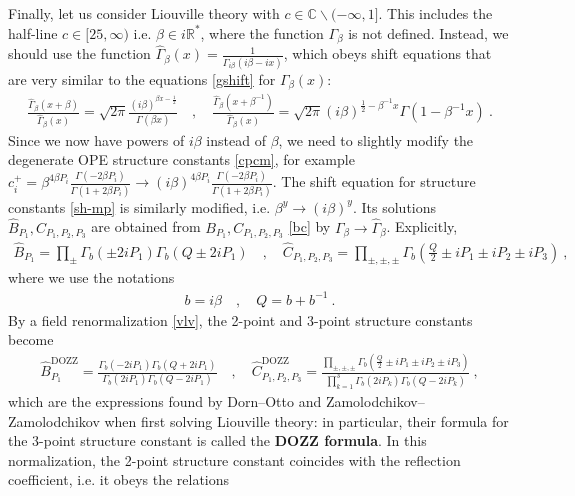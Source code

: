 \documentclass[12pt, a4paper]{article}
\newcommand{\myindex}[1]{\textbf{\boldmath #1}}
\begin{document}
Finally, let us consider Liouville theory with $c\in \mathbb{C}\backslash (-\infty,1]$. This includes the half-line $c\in [25,\infty)$ i.e. $\beta\in i\mathbb{R}^*$, where the function $\Gamma_\beta$ is not defined.
Instead, we should use the function $\hat{\Gamma}_\beta(x) = \frac{1}{\Gamma_{i\beta}(i\beta -ix)}$, which obeys shift equations that are very similar to the equations \eqref{gshift} for $\Gamma_\beta(x)$: 
\begin{align}
 \frac{\hat\Gamma_\beta(x+\beta)}{\hat\Gamma_\beta(x)} = \sqrt{2\pi}\frac{(i\beta)^{\beta x-\frac12}}{\Gamma(\beta x)}
\quad , \quad 
\frac{\hat\Gamma_\beta(x+\beta^{-1})}{\hat\Gamma_\beta(x)} = \sqrt{2\pi}(i\beta)^{\frac12-\beta^{-1}x}\Gamma(1-\beta^{-1}x) \ .
\label{hgshift}
\end{align}
Since we now have powers of $i\beta$ instead of $\beta$, we need to slightly modify the degenerate OPE structure constants \eqref{cpcm}, for example $c_i^+ = \beta^{4\beta P_i}\frac{\Gamma(-2\beta P_i)}{\Gamma(1+2\beta P_i)} \to (i\beta)^{4\beta P_i}\frac{\Gamma(-2\beta P_i)}{\Gamma(1+2\beta P_i)}$. The shift equation for structure constants \eqref{sh-mp} is similarly modified, i.e. $\beta^y \to (i\beta)^y$. Its solutions $\hat B_{P_1},\hat C_{P_1,P_2,P_3}$ are obtained from $B_{P_1},C_{P_1,P_2,P_3}$ \eqref{bc} by $\Gamma_\beta \to \hat\Gamma_\beta$. Explicitly,
\begin{align}
 \boxed{\hat B_{P_1} = \prod_\pm \Gamma_b\left(\pm 2iP_1\right)\Gamma_b\left(Q\pm 2iP_1\right)} \quad , \quad 
 \boxed{\hat C_{P_1,P_2,P_3} = \prod_{\pm,\pm,\pm} \Gamma_b\left(\tfrac{Q}{2} \pm iP_1\pm iP_2\pm iP_3\right)}\ ,
 \label{bci}
\end{align}
where we use the notations 
\begin{align}
 b = i\beta \quad , \quad Q = b + b^{-1} \ . 
 \label{bQ}
\end{align}
By a field renormalization \eqref{vlv}, the 2-point and 3-point structure constants become 
\begin{align}
 \hat B^\text{DOZZ}_{P_1} = \frac{\Gamma_b\left(- 2iP_1\right)\Gamma_b\left(Q+ 2iP_1\right)}{\Gamma_b\left( 2iP_1\right)\Gamma_b\left(Q- 2iP_1\right)} \quad , \quad 
 \hat C^\text{DOZZ}_{P_1,P_2,P_3} = \frac{\prod_{\pm,\pm,\pm} \Gamma_b\left(\tfrac{Q}{2} \pm iP_1\pm iP_2\pm iP_3\right)}{\prod_{k=1}^3 \Gamma_b(2iP_k)\Gamma_b(Q-2iP_k)}\ ,
 \label{dozz}
\end{align}
which are the expressions found by Dorn--Otto and Zamolodchikov--Zamolodchikov when first solving Liouville theory: in particular, their formula for the 3-point structure constant is called the \myindex{DOZZ formula}. In this normalization, the 2-point structure constant coincides with the reflection coefficient, i.e. it obeys the relations 
\end{document}
